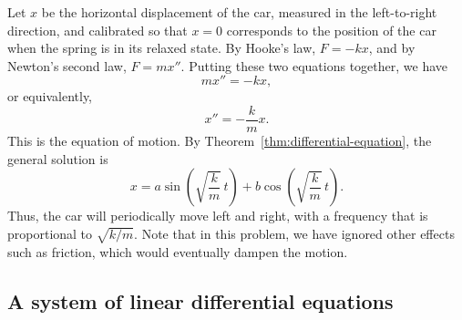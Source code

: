 \begin{solution}
  Let $x$ be the horizontal displacement of the car, measured in the
  left-to-right direction, and calibrated so that $x=0$ corresponds to
  the position of the car when the spring is in its relaxed state.
  By Hooke's law, $F=-kx$, and by Newton's second law,
  $F=mx''$. Putting these two equations together, we have
  \begin{equation*}
    mx'' = -kx,
  \end{equation*}
  or equivalently,
  \begin{equation*}
    x'' = -\frac{k}{m} x.
  \end{equation*}
  This is the equation of motion. By
  Theorem~\ref{thm:differential-equation}, the general solution is
  \begin{equation*}
    x = a\sin(\sqrt{\frac{k}{m}}\,t) + b\cos(\sqrt{\frac{k}{m}}\,t).
  \end{equation*}
  Thus, the car will periodically move left and right, with a
  frequency that is proportional to $\sqrt{k/m}$.  Note that in this
  problem, we have ignored other effects such as friction, which would
  eventually dampen the motion.
\end{solution}

\subsection{A system of linear differential equations}

